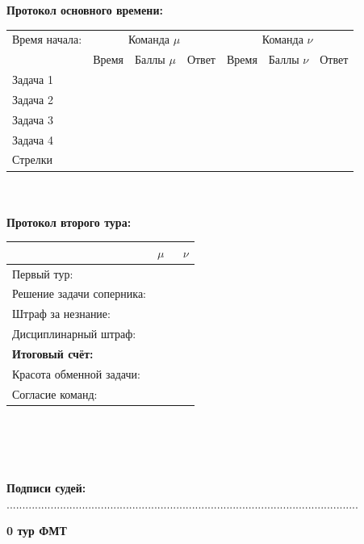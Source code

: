 \documentclass[12pt]{article}
\begin{document}
\begin{center}{\bf Протокол основного времени: } \\ 
\begin{tabular}{|p{3.3cm}|p{1.5cm}|p{2cm}|p{1.5cm}|p{1.5cm}|p{2cm}|p{1.5cm}|}
\hline Время начала: & \multicolumn{3}{c|}{Команда $\mu$} & \multicolumn{3}{c|}{Команда $\nu$ }\\\cline{2-7} {} & Время & Баллы $\mu$ & Ответ & Время & Баллы $\nu$ & Ответ \\\hline \hline \center Задача 1 &{}&{}&{}&{}&{}&{}\\[20mm]\hline \hline \center Задача 2 &{}&{}&{}&{}&{}&{}\\[20mm]\hline \hline \center Задача 3 &{}&{}&{}&{}&{}&{}\\[20mm]\hline \hline \center Задача 4 &{}&{}&{}&{}&{}&{}\\[20mm]\hline \hline \center Стрелки &{}&{}&{}&{}&{}&{}\\[20mm]\hline
\end{tabular}
$ $\\
$ $\\
{\bf Протокол второго тура: } \\ 
\begin{tabular}{ | p{7cm} | p{1cm} | p{1cm} |}
\hline
$ $ & \centering $\mu$ & $\;$ $\nu$ \\ \hline\raggedleft Первый тур: & & \\ \hline\raggedleft Решение задачи соперника: & & \\ \hline\raggedleft Штраф за незнание: & & \\ \hline\raggedleft Дисциплинарный штраф: & & \\ \hline\raggedleft \bf Итоговый счёт: & & \\ \hline \hline\raggedleft Красота обменной задачи: & & \\ \hline\raggedleft Согласие команд: & & \\ \hline\end{tabular}\end{center}
$ $\\
$ $\\
$ $\\
$ $\\
{\bf Подписи судей: }................................................................................................................\newpage
\begin{center}
{\Huge \bf 0 тур ФМТ}
\end{center}
\end{document}
